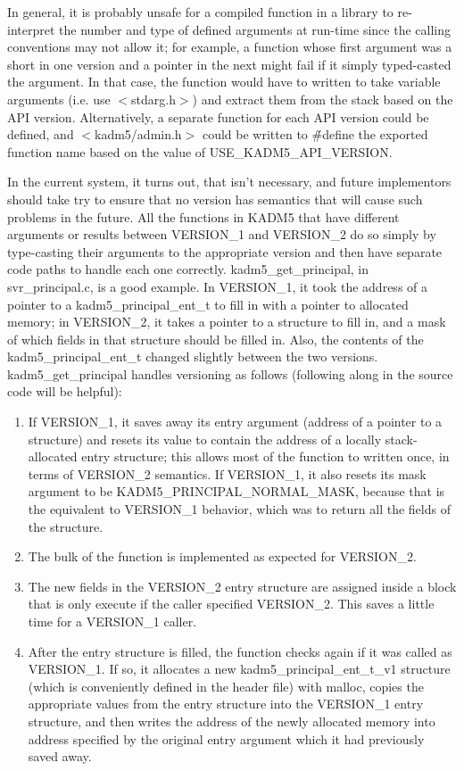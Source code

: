 In general, it is probably unsafe for a compiled function in a library
to re-interpret the number and type of defined arguments at run-time
since the calling conventions may not allow it; for example, a
function whose first argument was a short in one version and a pointer
in the next might fail if it simply typed-casted the argument.  In
that case, the function would have to written to take variable
arguments (i.e. use $<$stdarg.h$>$) and extract them from the stack
based on the API version.  Alternatively, a separate function for each
API version could be defined, and $<$kadm5/admin.h$>$ could be written
to \v{\#define} the exported function name based on the value of
USE_KADM5_API_VERSION.

In the current system, it turns out, that isn't necessary, and future
implementors should take try to ensure that no version has semantics
that will cause such problems in the future.  All the functions in
KADM5 that have different arguments or results between VERSION_1 and
VERSION_2 do so simply by type-casting their arguments to the
appropriate version and then have separate code paths to handle each
one correctly.  kadm5_get_principal, in svr_principal.c, is a good
example.  In VERSION_1, it took the address of a pointer to a
kadm5_principal_ent_t to fill in with a pointer to allocated memory;
in VERSION_2, it takes a pointer to a structure to fill in, and a mask
of which fields in that structure should be filled in.  Also, the
contents of the kadm5_principal_ent_t changed slightly between the two
versions.  kadm5_get_principal handles versioning as follows
(following along in the source code will be helpful):

\begin{enumerate}
\item If VERSION_1, it saves away its entry argument (address of a
pointer to a structure) and resets its value to contain the address of
a locally stack-allocated entry structure; this allows most of the
function to written once, in terms of VERSION_2 semantics.  If
VERSION_1, it also resets its mask argument to be
KADM5_PRINCIPAL_NORMAL_MASK, because that is the equivalent to
VERSION_1 behavior, which was to return all the fields of the
structure.

\item The bulk of the function is implemented as expected for
VERSION_2.

\item The new fields in the VERSION_2 entry structure are assigned
inside a block that is only execute if the caller specified
VERSION_2.  This saves a little time for a VERSION_1 caller.

\item After the entry structure is filled, the function checks again
if it was called as VERSION_1.  If so, it allocates a new
kadm5_principal_ent_t_v1 structure (which is conveniently defined in
the header file) with malloc, copies the appropriate values from the
entry structure into the VERSION_1 entry structure, and then writes
the address of the newly allocated memory into address specified by
the original entry argument which it had previously saved away.
\end{enumerate}

